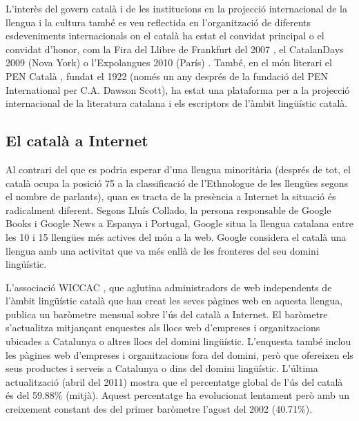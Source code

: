 \begin{multicols}{2}

L’interès del govern català i de les institucions en la projecció internacional de la llengua i la cultura també es veu reflectida en l’organització de diferents esdeveniments internacionals on el català ha estat el convidat principal o el convidat d’honor, com la Fira del Llibre de Frankfurt del 2007 \cite{CAT-Nota13}, el CatalanDays 2009 (Nova York) \cite{CAT-Nota14} o l’Expolangues 2010 (París) \cite{CAT-Nota15}. També, en el món literari el PEN Català \cite{CAT-Nota16}, fundat el 1922 (només un any després de la fundació del PEN International per C.A. Dawson Scott), ha estat una plataforma per a la projecció internacional de la literatura catalana i els escriptors de l’àmbit lingüístic català.

\subsection{El català a Internet}

 Al contrari del que es podria esperar d’una llengua minoritària (després de tot, el català ocupa la posició 75 a la classificació de l’Ethnologue \cite{CAT-Nota17} de les llengües segons el nombre de parlants), quan es tracta de la presència a Internet la situació és radicalment diferent. Segons Lluís Collado, la persona responsable de Google Books i Google News a Espanya i Portugal, Google situa la llengua catalana entre les 10 i 15 llengües més actives del món a la web. Google considera el català una llengua amb una activitat que va més enllà de les fronteres del seu domini lingüístic.  


L’associació WICCAC \cite{CAT-Nota18}, que aglutina administradors de web independents de l’àmbit lingüístic català que han creat les seves pàgines web en aquesta llengua, publica un baròmetre mensual sobre l’ús del català a Internet. El baròmetre s’actualitza mitjançant enquestes als llocs web d’empreses i organitzacions ubicades a Catalunya o altres llocs del domini lingüístic. L’enquesta també inclou les pàgines web d’empreses i organitzacions fora del domini, però que ofereixen els seus productes i serveis a Catalunya o dins del domini lingüístic. L’última actualització (abril del 2011) mostra que el percentatge global de l’ús del català és del 59.88\% (mitjà). Aquest percentatge ha evolucionat lentament però amb un creixement constant des del primer baròmetre l’agost del 2002 (40.71\%).


\end{multicols}
